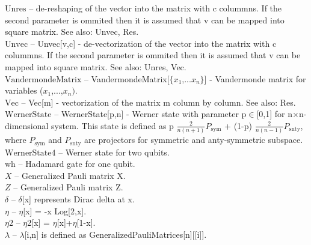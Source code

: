 \documentclass[a4paper,11pt]{article}
\begin{document}
\textbf{$ \text{Unres} $ }-- de-reshaping of the vector into the matrix with c colummns. If the second parameter is ommited then it is assumed that v can be mapped into square matrix. See also: Unvec, Res.$  $\\

\textbf{$ \text{Unvec} $ }-- Unvec[v,c] - de-vectorization of the vector into the matrix with c colummns. If the second parameter is ommited then it is assumed that v can be mapped into square matrix. See also: Unres, Vec.$  $\\

\textbf{$ \text{VandermondeMatrix} $ }-- VandermondeMatrix[$\{$$ x_1\text{,...}x_n $$\}$] - Vandermonde matrix for variables ($ x_1 $,...,$ x_n\text{).} $\\

\textbf{$ \text{Vec} $ }-- Vec[m] - vectorization of the matrix m column by column. See also: Res.$  $\\

\textbf{$ \text{WernerState} $ }-- WernerState[p,n] - Werner state with parameter p$\in $[0,1] for n$\times $n-dimensional system. This state is defined as p $ \frac{2}{n(n+1)}P_{\text{sym}} $ + (1-p) $ \frac{2}{n(n-1)}P_{\text{snty}} $, where $ P_{\text{sym}} $ and $ P_{\text{snty}} $ are projectors for symmetric and anty-symmetric subspace.$  $\\

\textbf{$ \text{WernerState4} $ }-- Werner state for two qubits.$  $\\

\textbf{$ \text{wh} $ }-- Hadamard gate for one qubit.$  $\\

\textbf{$ X $ }-- Generalized Pauli matrix X.$  $\\

\textbf{$ Z $ }-- Generalized Pauli matrix Z.$  $\\

\textbf{$ \delta  $ }-- $\delta $[x] represents Dirac delta at x.$  $\\

\textbf{$ \eta  $ }-- $\eta $[x] = -x Log[2,x].$  $\\

\textbf{$ \text{$\eta $2} $ }-- $\eta $2[x] = $\eta $[x]+$\eta $[1-x].$  $\\

\textbf{$ \lambda  $ }-- $\lambda $[i,n] is defined as GeneralizedPauliMatrices[n][[i]].$  $\\
\end{document}
